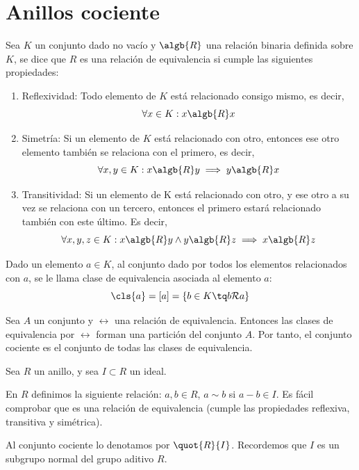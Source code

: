 \section{Anillos cociente}
\begin{defn}
	Sea $K$ un conjunto dado no vacío y $\algb{R}$ una relación binaria definida sobre $K$, se dice que $R$ es una relación de equivalencia si cumple las siguientes propiedades:
	\begin{enumerate}
		\item Reflexividad: Todo elemento de $K$ está relacionado consigo mismo, es decir,
		\[ \forall x \in K: x \algb{R} x \]
		\item Simetría: Si un elemento de $K$ está relacionado con otro, entonces ese otro elemento también se relaciona con el primero, es decir,
		\[ \forall x,y \in K: x \algb{R} y \implies y \algb{R} x \]

		\item Transitividad:  Si un elemento de K está relacionado con otro, y ese otro a su vez se relaciona con un tercero, entonces el primero estará relacionado también con este último. Es decir,
		\[ \forall x,y,z \in K: x \algb{R} y \wedge y \algb{R} z \implies x \algb{R} z \]
	\end{enumerate}
\end{defn}

\begin{defn}
	Dado un elemento $a\in K$, al conjunto dado por todos los elementos relacionados con $a$, se le llama clase de equivalencia asociada al elemento $a$:
	$$ \cls{a}=[a] = \{b\in K \tq b\mathcal{R}a\} $$
\end{defn}

\begin{defn}
	Sea $A$ un conjunto y $\rel$ una relación de equivalencia. Entonces las clases de equivalencia por $\rel$ forman una partición del conjunto $A$. Por tanto, el conjunto cociente es el conjunto de todas las clases de equivalencia.
\end{defn}


Sea $R$ un anillo, y sea $I\subset R$ un ideal.

En $R$ definimos la siguiente relación: $a,b \in R$, $a \sim b$ si $a-b \in I$. Es fácil comprobar que es una relación de equivalencia (cumple las propiedades reflexiva, transitiva y simétrica).

Al conjunto cociente lo denotamos por $\quot{R}{I}$. Recordemos que $I$ es un subgrupo normal del grupo aditivo $R$.

